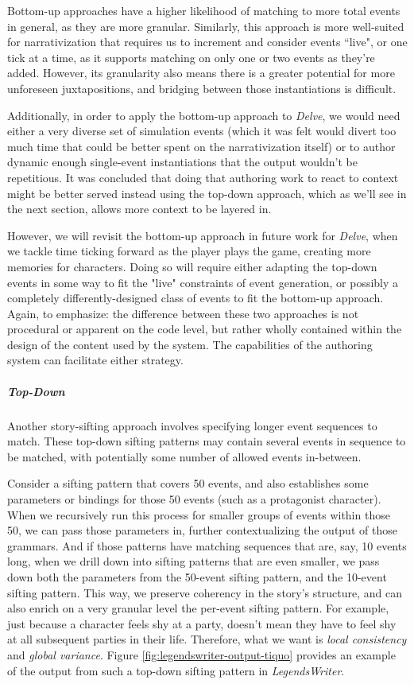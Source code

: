 
Bottom-up approaches have a higher likelihood of matching to more total events in general, as they are more granular. Similarly, this approach is more well-suited for narrativization that requires us to increment and consider events ``live", or one tick at a time, as it supports matching on only one or two events as they're added. However, its granularity also means there is a greater potential for more unforeseen juxtapositions, and bridging between those instantiations is difficult. 

Additionally, in order to apply the bottom-up approach to \textit{Delve}, we would need either a very diverse set of simulation events (which it was felt would divert too much time that could be better spent on the narrativization itself) or to author dynamic enough single-event instantiations that the output wouldn't be repetitious. It was concluded that doing that authoring work to react to context might be better served instead using the top-down approach, which as we'll see in the next section, allows more context to be layered in.

However, we will revisit the bottom-up approach in future work for \textit{Delve}, when we tackle time ticking forward as the player plays the game, creating more memories for characters. Doing so will require either adapting the top-down events in some way to fit the "live" constraints of event generation, or possibly a completely differently-designed class of events to fit the bottom-up approach. Again, to emphasize: the difference between these two approaches is not procedural or apparent on the code level, but rather wholly contained within the design of the content used by the system. The capabilities of the authoring system can facilitate either strategy.

\subparagraph{Top-Down}\label{subpar:delve-top-down}

Another story-sifting approach involves specifying longer event sequences to match. These top-down sifting patterns may contain several events in sequence to be matched, with potentially some number of allowed events in-between.

Consider a sifting pattern that covers 50 events, and also establishes some parameters or bindings for those 50 events (such as a protagonist character). When we recursively run this process for smaller groups of events within those 50, we can pass those parameters in, further contextualizing the output of those grammars. And if those patterns have matching sequences that are, say, 10 events long, when we drill down into sifting patterns that are even smaller, we pass down both the parameters from the 50-event sifting pattern, and the 10-event sifting pattern. This way, we preserve coherency in the story's structure, and can also enrich on a very granular level the per-event sifting pattern. For example, just because a character feels shy at a party, doesn't mean they have to feel shy at all subsequent parties in their life. Therefore, what we want is \textit{local consistency} and \textit{global variance}. Figure \ref{fig:legendswriter-output-tiquo} provides an example of the output from such a top-down sifting pattern in \textit{LegendsWriter}.


